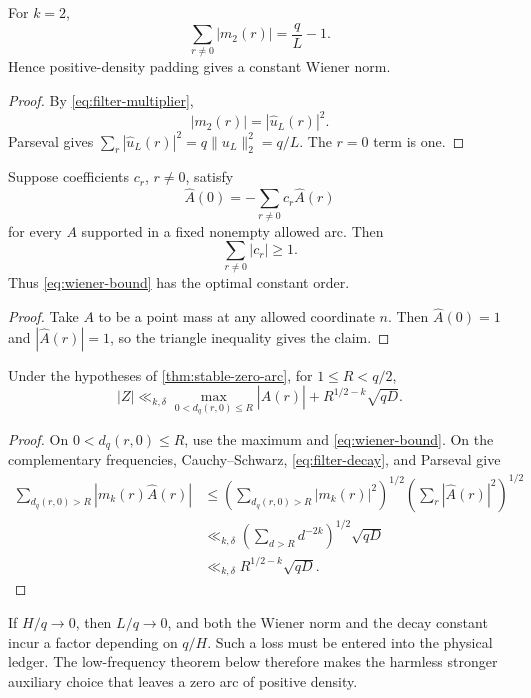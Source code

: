 \begin{proposition}
\label{prop:triangular-wiener}
For \(k=2\),
\begin{equation}
 \sum_{r\ne0}|m_2(r)|=\frac qL-1.
\label{eq:triangular-wiener}
\end{equation}
Hence positive-density padding gives a constant Wiener norm.
\end{proposition}

\begin{proof}
By \eqref{eq:filter-multiplier},
\[
 |m_2(r)|=|\widehat u_L(r)|^2.
\]
Parseval gives
\(\sum_r|\widehat u_L(r)|^2=q\|u_L\|_2^2=q/L\).
The \(r=0\) term is one.
\end{proof}

\begin{proposition}
\label{prop:wiener-optimality}
Suppose coefficients \(c_r\), \(r\ne0\), satisfy
\[
 \widehat A(0)
 =-\sum_{r\ne0}c_r\widehat A(r)
\]
for every \(A\) supported in a fixed nonempty allowed arc.  Then
\[
 \sum_{r\ne0}|c_r|\ge1.
\]
Thus \eqref{eq:wiener-bound} has the optimal constant order.
\end{proposition}

\begin{proof}
Take \(A\) to be a point mass at any allowed coordinate \(n\).  Then
\(\widehat A(0)=1\) and \(|\widehat A(r)|=1\), so the triangle
inequality gives the claim.
\end{proof}

\begin{theorem}
\label{thm:low-frequency-reduction}
Under the hypotheses of \cref{thm:stable-zero-arc}, for
\(1\le R<q/2\),
\begin{equation}
 \boxed{
 |Z|
 \ll_{k,\delta}
 \max_{0<d_q(r,0)\le R}|\widehat A(r)|
 +R^{1/2-k}\sqrt{qD}.}
\label{eq:abstract-low-frequency}
\end{equation}
\end{theorem}

\begin{proof}
On \(0<d_q(r,0)\le R\), use the maximum and
\eqref{eq:wiener-bound}.  On the complementary frequencies,
Cauchy--Schwarz, \eqref{eq:filter-decay}, and Parseval give
\begin{align*}
 \sum_{d_q(r,0)>R}|m_k(r)\widehat A(r)|
 &\le
 \left(\sum_{d_q(r,0)>R}|m_k(r)|^2\right)^{1/2}
 \left(\sum_r|\widehat A(r)|^2\right)^{1/2}\\
 &\ll_{k,\delta}
 \left(\sum_{d>R}d^{-2k}\right)^{1/2}\sqrt{qD}\\
 &\ll_{k,\delta}R^{1/2-k}\sqrt{qD}.
\end{align*}
\end{proof}

\begin{remark}
If \(H/q\to0\), then \(L/q\to0\), and both the Wiener norm and the
decay constant incur a factor depending on \(q/H\).  Such a loss must
be entered into the physical ledger.  The low-frequency theorem below
therefore makes the harmless stronger auxiliary choice that leaves a
zero arc of positive density.
\end{remark}
